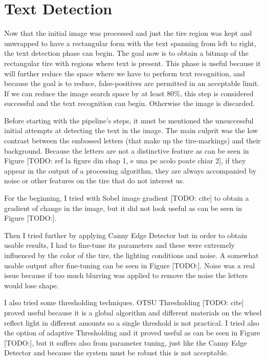 \section{Text Detection}\label{sec:text-detection}
Now that the initial image was processed and just the tire region was kept and unwrapped to have a rectangular form with the text spanning from left to right, the text detection phase can begin. The goal now is to obtain a bitmap of the rectangular tire with regions where text is present. This phase is useful because it will further reduce the space where we have to perform text recognition, and because the goal is to reduce, false-positives are permitted in an acceptable limit. If we can reduce the image search space by at least 80\%, this step is considered successful and the text recognition can begin. Otherwise the image is discarded.

Before starting with the pipeline's steps, it must be mentioned the unsuccessful initial attempts at detecting the text in the image. The main culprit was the low contrast between the embossed letters (that make up the tire-markings) and their background. Because the letters are not a distinctive feature as can be seen in Figure [TODO: ref la figure din chap 1, e una pe acolo poate chiar 2], if they appear in the output of a processing algorithm, they are always accompanied by noise or other features on the tire that do not interest us.

For the beginning, I tried with Sobel image gradient [TODO: cite] to obtain a gradient of change in the image, but it did not look useful as can be seen in Figure [TODO:].

Then I tried further by applying Canny Edge Detector \cite{site:Canny_edge_detection} but in order to obtain usable results, I had to fine-tune its parameters and these were extremely influenced by the color of the tire, the lighting conditions and noise. A somewhat usable output after fine-tuning can be seen in Figure [TODO:]. Noise was a real issue because if too much blurring was applied to remove the noise the letters would lose shape.

I also tried some thresholding techniques. OTSU Thresholding [TODO: cite] proved useful because it is a global algorithm and different materials on the wheel reflect light in different amounts so a single threshold is not practical. I tried also the option of adaptive Thresholding and it proved useful as can be seen in Figure [TODO:], but it suffers also from parameter tuning, just like the Canny Edge Detector and because the system must be robust this is not acceptable.

